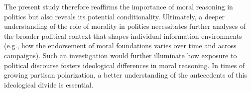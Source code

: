 \documentclass[12pt]{article}
\begin{document}
The present study therefore reaffirms the importance of moral reasoning in politics but also reveals its potential conditionality. Ultimately, a deeper understanding of the role of morality in politics necessitates further analyses of the broader political context that shapes individual information environments (e.g., how the endorsement of moral foundations varies over time and across campaigns). Such an investigation would further illuminate how exposure to political discourse fosters ideological differences in moral reasoning. In times of growing partisan polarization, a better understanding of the antecedents of this ideological divide is essential.




%
%
%
%
%
\end{document}

